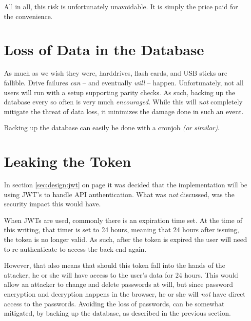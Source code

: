 
		All in all, this risk is unfortunately unavoidable. It is simply the price paid for the convenience.
	
	\section{Loss of Data in the Database}
		As much as we wish they were, harddrives, flash cards, and USB sticks are fallible. Drive failures \emph{can} -- and eventually \emph{will} -- happen. Unfortunately, not all users will run with a setup supporting parity checks. As such, backing up the database every so often is very much \emph{encouraged}. While this will \emph{not} completely mitigate the threat of data loss, it minimizes the damage done in such an event.

		Backing up the database can easily be done with a cronjob \emph{(or similar)}.

	\section{Leaking the Token}
		In section \ref{sec:design:jwt} on page \pageref{sec:design:jwt} it was decided that the implementation will be using JWT's to handle API authentication. What was \emph{not} discussed, was the security impact this would have.

		When JWTs are used, commonly there is an expiration time set. At the time of this writing, that timer is set to 24 hours, meaning that 24 hours after issuing, the token is no longer valid. As such, after the token is expired the user will need to re-authenticate to access the back-end again.

		However, that also means that should this token fall into the hands of the attacker, he or she will have access to the user's data for 24 hours. This would allow an attacker to change and delete passwords at will, but since password encryption and decryption happens in the browser, he or she will \emph{not} have direct access to the passwords. Avoiding the loss of passwords, can be somewhat mitigated, by backing up the database, as described in the previous section.

